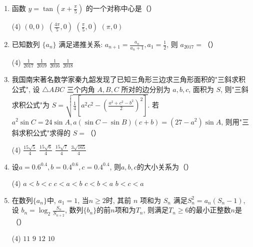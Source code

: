 \documentclass[17pt,twoside,space]{ctexart}
\begin{document}
\begin{enumerate}[itemsep=0.2em,topsep=0pt]
\item 函数 $y = \tan (x+\frac{\pi }{5})$ 的一个对称中心是（\hspace{7pt}）
\begin{tasks}(4)
	\task $(0,0)$ \task $(\frac{4\pi }{5},0)$ \task $(\frac{\pi }{5},0)$ \task $(\pi , 0)$
\end{tasks}

\item 已知数列 $\{a_n\}$ 满足递推关系: $a_{n+1} = \frac{a_n}{a_n + 1}, a_1 = \frac{1}{2}$, 则 $a_{2017} =$（\hspace{7pt}）
\begin{tasks}(4)
	\task $\frac{1}{2017}$ \task $\frac{1}{2019}$ \task $\frac{1}{2016}$ \task $\frac{1}{2018}$ 
\end{tasks}

\item 我国南宋著名数学家秦九韶发现了已知三角形三边求三角形面积的"三斜求积公式", 设 $\triangle ABC$ 三个内角 $A, B, C$ 所对的边分别为 $a, b, c$, 面积为 $S$, 则"三斜求积公式"为 $S = \sqrt{\frac{1}{4}[a^2c^2-(\frac{a^2+c^2-b^2}{2})^2]}$. 若 $ a^2\sin C = 24\sin A, a(\sin C - \sin B)(c+b) =(27-a^2)\sin A$, 则用"三斜求积公式"求得的 $S=$（\hspace{7pt}）
\begin{tasks}(4)
	\task $\frac{15\sqrt{5}}{4}$ \task $\frac{15\sqrt{6}}{4}$ \task $\frac{15\sqrt{7}}{4}$ \task $\frac{3\sqrt{165}}{4}$ 
\end{tasks}

\item 设$a=0.6^{0.4}, b=0.4^{0.6}, c=0.4^{0.4}$, 则$a, b, c$的大小关系为（\hspace{7pt}）
\begin{tasks}(4)
	\task $a<b<c$ \task $c<a<b$ \task $c<b<a$ \task $b<c<a$ 
\end{tasks}

\item 在数列$\{a_n\}$中, $a_1=1$, 当$n \geqslant 2$时, 其前 $n$ 项和为 $S_n$ 满足$S_n^2 = a_n(S_n-1)$, 设 $b_n=\log _2 \frac{S_n}{S_{n+2}}$, 数列$\{b_n\}$的前$n$项和为$T_n$, 则满足$T_n \geqslant 6$的最小正整数$n$是（\hspace{7pt}）
\begin{tasks}(4)
	\task $11$ \task $9$ \task $12$ \task $10$ 
\end{tasks}

\end{enumerate}


\end{document}
